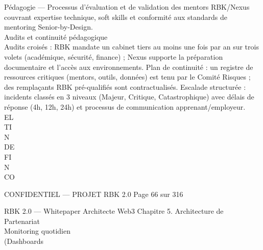 \documentclass[12pt,landscape,a4paper]{article}
\newenvironment{confidential}
{\begin{tcolorbox}[
    colback=rbkred!5!white,
    colframe=rbkred!75!black,
    title=CONFIDENTIEL,
    fonttitle=\bfseries\color{white},
    coltitle=rbkred!75!black,
    breakable,
    enhanced,
    frame hidden,
    borderline west={2pt}{0pt}{rbkred!75!black}
]}
{\end{tcolorbox}}
\begin{document}
Pédagogie — Processus d’évaluation et de validation des mentors RBK/Nexus couvrant expertise technique, soft skills et conformité aux standards de\\
mentoring Senior-by-Design.\\
\vspace{0.5em}
\vspace{0.5em}
Audits et continuité pédagogique\\
\vspace{0.5em}
Audits croisés : RBK mandate un cabinet tiers au moins une fois par an sur trois volets (académique, sécurité, finance) ; Nexus supporte la préparation\\
documentaire et l’accès aux environnements. Plan de continuité : un registre de ressources critiques (mentors, outils, données) est tenu par le Comité Risques ;\\
des remplaçants RBK pré-qualifiés sont contractualisés. Escalade structurée : incidents classés en 3 niveaux (Majeur, Critique, Catastrophique) avec délais de\\
réponse (4h, 12h, 24h) et processus de communication apprenant/employeur.\\
\vspace{0.5em}
\vspace{0.5em}
\vspace{0.5em}
\vspace{0.5em}
EL\\
TI\\
N\\
DE\\
FI\\
N\\
CO\\
\vspace{0.5em}
\vspace{0.5em}
\vspace{0.5em}
\vspace{0.5em}
\begin{confidential}CONFIDENTIEL — PROJET RBK 2.0                                           Page 66 sur 316\end{confidential}
RBK 2.0 — Whitepaper Architecte Web3                                                                                                Chapitre 5. Architecture de Partenariat\\
\vspace{0.5em}
\vspace{0.5em}
Monitoring quotidien\\
(Dashboards\\
\end{document}
